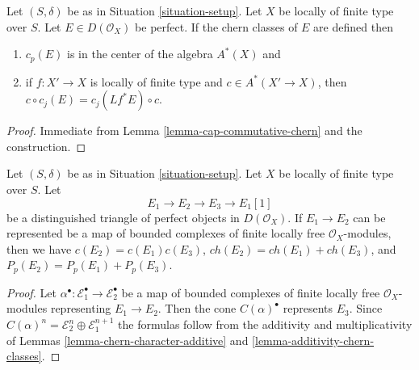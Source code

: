 \begin{lemma}
\label{lemma-commutative-chern-perfect}
Let $(S, \delta)$ be as in Situation \ref{situation-setup}.
Let $X$ be locally of finite type over $S$.
Let $E \in D(\mathcal{O}_X)$ be perfect. If the chern classes
of $E$ are defined then
\begin{enumerate}
\item $c_p(E)$ is in the center of the algebra $A^*(X)$ and
\item if $f : X' \to X$ is locally of finite type and $c \in A^*(X' \to X)$,
then $c \circ c_j(E) = c_j(Lf^*E) \circ c$.
\end{enumerate}
\end{lemma}

\begin{proof}
Immediate from Lemma \ref{lemma-cap-commutative-chern} and the
construction.
\end{proof}

\begin{lemma}
\label{lemma-additivity-on-perfect}
Let $(S, \delta)$ be as in Situation \ref{situation-setup}.
Let $X$ be locally of finite type over $S$. Let
$$
E_1 \to E_2 \to E_3 \to E_1[1]
$$
be a distinguished triangle of perfect objects in $D(\mathcal{O}_X)$.
If $E_1 \to E_2$ can be represented be a map of bounded complexes
of finite locally free $\mathcal{O}_X$-modules, then we have
$c(E_2) = c(E_1) c(E_3)$, $ch(E_2) = ch(E_1) + ch(E_3)$, and
$P_p(E_2) = P_p(E_1) + P_p(E_3)$.
\end{lemma}

\begin{proof}
Let $\alpha^\bullet : \mathcal{E}_1^\bullet \to \mathcal{E}_2^\bullet$
be a map of bounded complexes of finite locally free $\mathcal{O}_X$-modules
representing $E_1 \to E_2$. Then the cone $C(\alpha)^\bullet$
represents $E_3$. Since
$C(\alpha)^n = \mathcal{E}_2^n \oplus \mathcal{E}_1^{n + 1}$
the formulas follow from the additivity and multiplicativity
of Lemmas \ref{lemma-chern-character-additive} and
\ref{lemma-additivity-chern-classes}.
\end{proof}

